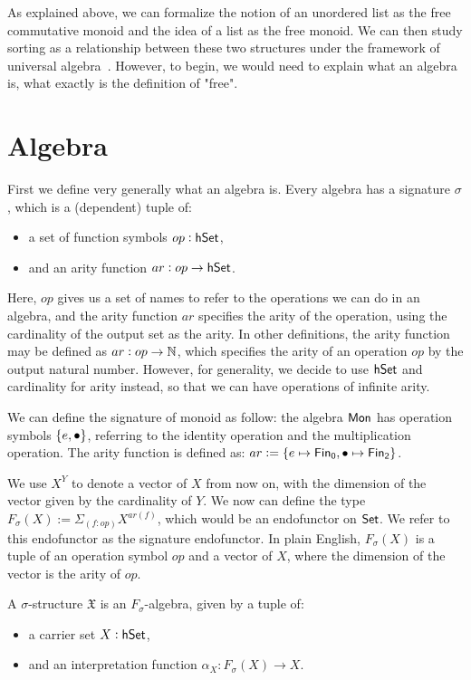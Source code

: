 \label{sec:universal-algebra}

As explained above, we can formalize the notion of an unordered list
as the free commutative monoid and the idea of a list as the free
monoid. We can then study sorting as a relationship between these
two structures under the framework of universal algebra~\cite{birkhoffStructureAbstractAlgebras1935}.
However, to begin, we would need to explain what an algebra is,
what exactly is the definition of "free".

\section{Algebra}
First we define very generally what an algebra is. Every algebra
has a signature $\sigma$, which is a (dependent) tuple of:
\begin{itemize}
    \item a set of function symbols $op : \mathsf{hSet}$,
    \item and an arity function $ar : op \to \mathsf{hSet}$.
\end{itemize}

Here, $op$ gives us a set of names to refer to the operations we can do
in an algebra, and the arity function $ar$ specifies the arity of the operation,
using the cardinality of the output set as the arity. In other definitions,
the arity function may be defined as $ar : op \to \mathbb{N}$, which specifies
the arity of an operation $op$ by the output natural number. However,
for generality, we decide to use $\mathsf{hSet}$ and cardinality for arity instead,
so that we can have operations of infinite arity. 

\begin{example}
We can define the signature of monoid as follow: the algebra $\mathsf{Mon}$
has operation symbols $\{ e, \mathbin{\bullet} \}$, referring to the identity operation
and the multiplication operation. The arity function is defined as:
$ar := \{ e \mapsto \Fin[0], \mult \mapsto \Fin[2] \}$.
\end{example}

We use $X^Y$ to denote a vector of $X$ from now on, with the dimension of
the vector given by the cardinality of $Y$. We now can define the type
$F_\sigma(X) := \Sigma_{(f: op)}X^{ar(f)}$, which would be an endofunctor
on $\mathsf{Set}$. We refer to this endofunctor as the signature endofunctor.
In plain English, $F_\sigma(X)$ is a tuple of an operation symbol $op$
and a vector of $X$, where the dimension of the vector is the arity of $op$.

\begin{definition}
    A $\sigma$-structure $\mathfrak{X}$ is an $F_\sigma$-algebra, given by a tuple
    of:
    \begin{itemize}
        \item a carrier set $X : \mathsf{hSet}$,
        \item and an interpretation function $\alpha_X : F_\sigma(X) \to X$.
    \end{itemize}
\end{definition}

